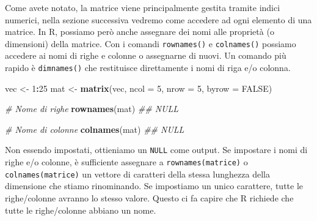 \documentclass[
]{book}
\newenvironment{Shaded}{\begin{snugshade}}{\end{snugshade}}
\newcommand{\CommentTok}[1]{\textcolor[rgb]{0.56,0.35,0.01}{\textit{#1}}}
\newcommand{\DataTypeTok}[1]{\textcolor[rgb]{0.13,0.29,0.53}{#1}}
\newcommand{\DecValTok}[1]{\textcolor[rgb]{0.00,0.00,0.81}{#1}}
\newcommand{\KeywordTok}[1]{\textcolor[rgb]{0.13,0.29,0.53}{\textbf{#1}}}
\newcommand{\NormalTok}[1]{#1}
\newcommand{\OperatorTok}[1]{\textcolor[rgb]{0.81,0.36,0.00}{\textbf{#1}}}
\newcommand{\OtherTok}[1]{\textcolor[rgb]{0.56,0.35,0.01}{#1}}
\newcommand{\StringTok}[1]{\textcolor[rgb]{0.31,0.60,0.02}{#1}}
\begin{document}
Come avete notato, la matrice viene principalmente gestita tramite indici numerici, nella sezione successiva vedremo come accedere ad ogni elemento di una matrice. In R, possiamo però anche assegnare dei nomi alle proprietà (o dimensioni) della matrice. Con i comandi \texttt{rownames()} e \texttt{colnames()} possiamo accedere ai nomi di righe e colonne o assegnarne di nuovi. Un comando più rapido è \texttt{dimnames()} che restituisce direttamente i nomi di riga e/o colonna.

\begin{Shaded}
\begin{Highlighting}[]
\NormalTok{vec <-}\StringTok{ }\DecValTok{1}\OperatorTok{:}\DecValTok{25}
\NormalTok{mat <-}\StringTok{ }\KeywordTok{matrix}\NormalTok{(vec, }\DataTypeTok{ncol =} \DecValTok{5}\NormalTok{, }\DataTypeTok{nrow =} \DecValTok{5}\NormalTok{, }\DataTypeTok{byrow =} \OtherTok{FALSE}\NormalTok{)}

\CommentTok{# Nome di righe}
\KeywordTok{rownames}\NormalTok{(mat)}
\CommentTok{## NULL}

\CommentTok{# Nome di colonne}
\KeywordTok{colnames}\NormalTok{(mat)}
\CommentTok{## NULL}
\end{Highlighting}
\end{Shaded}

Non essendo impostati, ottieniamo un \texttt{NULL} come output. Se impostare i nomi di righe e/o colonne, è sufficiente assegnare a \texttt{rownames(matrice)} o \texttt{colnames(matrice)} un vettore di caratteri della stessa lunghezza della dimensione che stiamo rinominando. Se impostiamo un unico carattere, tutte le righe/colonne avranno lo stesso valore. Questo ci fa capire che R richiede che tutte le righe/colonne abbiano un nome.
\end{document}
